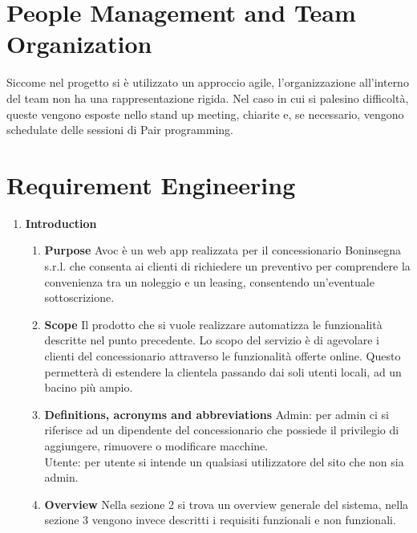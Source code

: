 \documentclass[12pt]{article}
\begin{document}
\section{People Management and Team Organization}
Siccome nel progetto si è utilizzato un approccio agile, l'organizzazione all'interno del team non ha una rappresentazione rigida.
Nel caso in cui si palesino difficoltà, queste vengono esposte nello stand up meeting, chiarite e, se necessario, vengono schedulate delle sessioni di Pair programming.

\pagebreak
\section{Requirement Engineering}

\begin{enumerate}
  \item\textbf{\large Introduction} 
  \begin{enumerate}
    \item\textbf{Purpose} \newline
    Avoc è un web app realizzata per il concessionario Boninsegna s.r.l. che consenta ai clienti di richiedere un preventivo per comprendere la convenienza tra un noleggio e un leasing, consentendo un'eventuale sottoscrizione.
    \item\textbf{Scope} \newline
    Il prodotto che si vuole realizzare automatizza le funzionalità descritte nel punto precedente.
  Lo scopo del servizio è di agevolare i clienti del concessionario attraverso le funzionalità offerte online.
  Questo permetterà di estendere la clientela passando dai soli utenti locali, ad un bacino più ampio.
    \item\textbf{Definitions, acronyms and abbreviations} \newline
    Admin: per admin ci si riferisce ad un dipendente del concessionario che possiede il privilegio di aggiungere, rimuovere o modificare macchine. \\
    Utente: per utente si intende un qualsiasi utilizzatore del sito che non sia admin.
    \item\textbf{Overview} \newline
    Nella sezione 2 si trova un overview generale del sistema, nella sezione 3 vengono invece descritti i requisiti funzionali e non funzionali.


\end{enumerate}
\end{enumerate}
\end{document}
